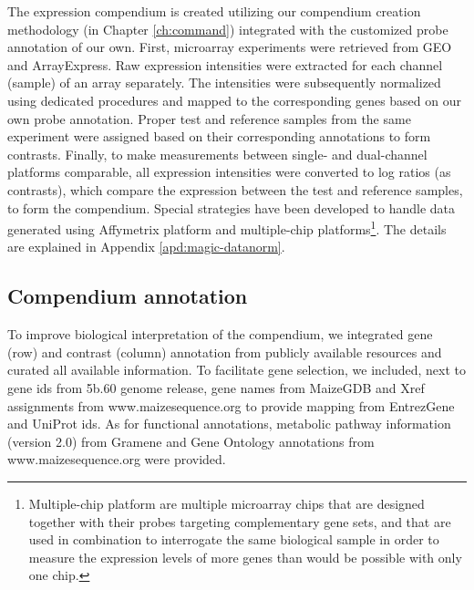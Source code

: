 The expression compendium is created utilizing our compendium creation
methodology (in Chapter \ref{ch:command}) integrated with the
customized probe annotation of our own.
%
First, microarray experiments were retrieved from GEO and ArrayExpress.  
%
Raw expression intensities were extracted for each channel (sample) of
an array separately.  
%
The intensities were subsequently normalized using dedicated
procedures and mapped to the corresponding genes based on our own
probe annotation.
%
Proper test and reference samples from the same experiment were
assigned based on their corresponding annotations to form contrasts.
%
Finally, to make measurements between single- and dual-channel
platforms comparable, all expression intensities were converted to log
ratios (as contrasts), which compare the expression between the test
and reference samples, to form the compendium.
%
Special strategies have been developed to handle data generated using
Affymetrix platform and multiple-chip platforms\footnote{Multiple-chip
  platform are multiple microarray chips that are designed together
  with their probes targeting complementary gene sets, and that are
  used in combination to interrogate the same biological sample in
  order to measure the expression levels of more genes than would be
  possible with only one chip.}.  The details are explained in Appendix 
\ref{apd:magic-datanorm}.  



\subsection{Compendium annotation}\label{sec:magic-anno}

To improve biological interpretation of the compendium, we integrated
gene (row) and contrast (column) annotation from publicly available 
resources and curated all available information.
To facilitate gene selection, we included, next to gene ids from 5b.60
genome release, gene names from MaizeGDB \cite{Lawrence2004} and
Xref assignments from www.maizesequence.org to provide mapping from
EntrezGene and UniProt ids. As for functional annotations, metabolic
pathway information (version 2.0) from Gramene \cite{Youens-Clark2010} and Gene 
Ontology annotations from www.maizesequence.org
were provided.

